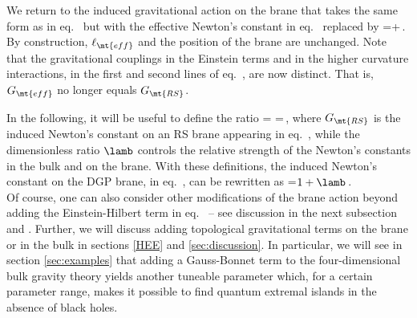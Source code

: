 We return to the induced gravitational action on the brane that takes the same form as in eq.~ but with the effective Newton's constant in eq.~ replaced by
\beq
{}=+\,.
\label{Newton33}
\eeq
By construction, $\ell_\mt{eff}$ and the position of the brane are unchanged. Note that the gravitational couplings in the Einstein terms and in the higher curvature interactions, \ie in the first and second lines of eq.~,  are now distinct. That is, $G_\mt{eff}$ no longer equals $G_\mt{RS}$. 

In the following, it will be useful to define the ratio
\beq\label{newdefs}
\lamb=
\quad {}=\,,
\eeq
where $G_\mt{RS}$ is the induced Newton's constant on an RS brane appearing in eq.~, while the dimensionless ratio $\lamb$ controls the relative strength of the Newton's constants in the bulk and on the brane. With these definitions, the induced Newton's constant on the DGP brane, in eq.~, can be rewritten as
\beq\label{Newton34}
=\(1+\lamb\)\,.
\eeq\\

Of course, one can also consider other modifications of the brane action beyond adding the Einstein-Hilbert term in eq.~ -- see discussion in the next subsection and \cite{domino}. Further, we will discuss adding topological gravitational terms on the brane or in the bulk in sections \ref{HEE} and \ref{sec:discussion}. In particular, we will see in section \ref{sec:examples} that adding a Gauss-Bonnet term to the four-dimensional bulk gravity theory yields another tuneable parameter which, for a certain parameter range, makes it possible to find quantum extremal islands in the absence of black holes. 
